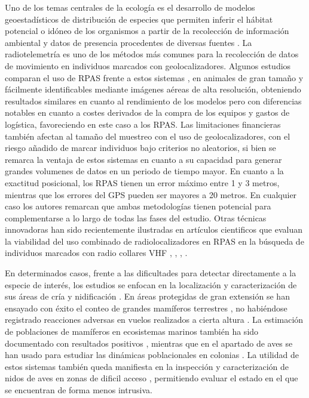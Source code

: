 \documentclass[9t,twocolumn]{article}
\begin{document}
Uno de los temas centrales de la ecología es el desarrollo de modelos
geoestadísticos de distribución de especies que permiten inferir el
hábitat potencial o idóneo de los organismos a partir de la recolección
de información ambiental y datos de presencia procedentes de diversas
fuentes \citep{Mateo2011}. La radiotelemetría es uno de los métodos más
comunes para la recolección de datos de movimiento en individuos
marcados con geolocalizadores. Algunos estudios comparan el uso de RPAS
frente a estos sistemas \citep{PazmanyMulero2015},
\citep{Mulero-Pazmany2015} en animales de gran tamaño y fácilmente
identificables mediante imágenes aéreas de alta resolución, obteniendo
resultados similares en cuanto al rendimiento de los modelos pero con
diferencias notables en cuanto a costes derivados de la compra de los
equipos y gastos de logística, favoreciendo en este caso a los RPAS. Las
limitaciones financieras también afectan al tamaño del muestreo con el
uso de geolocalizadores, con el riesgo añadido de marcar individuos bajo
criterios no aleatorios, si bien se remarca la ventaja de estos sistemas
en cuanto a su capacidad para generar grandes volumenes de datos en un
periodo de tiempo mayor. En cuanto a la exactitud posicional, los RPAS
tienen un error máximo entre 1 y 3 metros, mientras que los errores del
GPS pueden ser mayores a 20 metros. En cualquier caso los autores
remarcan que ambas metodologías tienen potencial para complementarse a
lo largo de todas las fases del estudio. Otras técnicas innovadoras han
sido recientemente ilustradas en artículos cientificos que evaluan la
viabilidad del uso combinado de radiolocalizadores en RPAS en la
búsqueda de individuos marcados con radio collares VHF
\citep{Korner2010}, \citep{Bayram2016}, \citep{Cliff2015},
\citep{Leonardo2013}.

En determinados casos, frente a las dificultades para detectar
directamente a la especie de interés, los estudios se enfocan en la
localización y caracterización de sus áreas de cría y nidificación
\citep{VanAndel2015}. En áreas protegidas de gran extensión se han
ensayado con éxito el conteo de grandes mamíferos terrestres , no
habiéndose registrado reacciones adversas en vuelos realizados a cierta
altura \citep{Vermeulen2013}. La estimación de poblaciones de mamíferos
en ecosistemas marinos también ha sido documentado con resultados
positivos \citep{Hodgson2013}, mientras que en el apartado de aves se
han usado para estudiar las dinámicas poblacionales en colonias
\citep{Sarda-Palomera2012}. La utilidad de estos sistemas también queda
manifiesta en la inspección y caracterización de nidos de aves en zonas
de dificil acceso \citep{Weissensteiner2015}, permitiendo evaluar el
estado en el que se encuentran de forma menos intrusiva.
\end{document}
